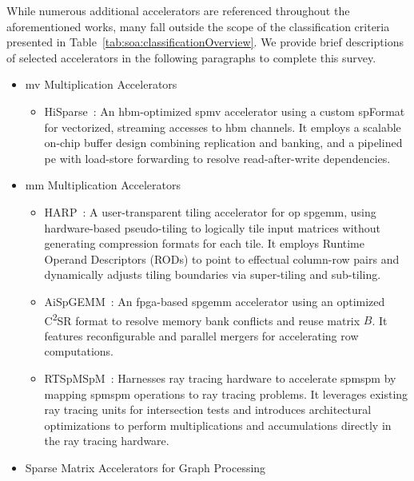 While numerous additional accelerators are referenced throughout the aforementioned works, many fall outside the scope of the classification criteria presented in Table~\ref{tab:soa:classificationOverview}.
We provide brief descriptions of selected accelerators in the following paragraphs to complete this survey.
\begin{itemize}
    \item \acrfull{mv} Multiplication Accelerators
    \begin{itemize}
        \item HiSparse~\cite{Du2022_HiSparse}: An \acrshort{hbm}-optimized \acrshort{spmv} accelerator using a custom \gls{spFormat} for vectorized, streaming accesses to \acrshort{hbm} channels.
        It employs a scalable on-chip buffer design combining replication and banking, and a pipelined \acrshort{pe} with load-store forwarding to resolve read-after-write dependencies.
    \end{itemize}
    \item \acrfull{mm} Multiplication Accelerators
    \begin{itemize}
        \item HARP~\cite{Kim2023_HARP}: A user-transparent \gls{tiling} accelerator for \acrshort{op} \acrshort{spgemm}, using hardware-based pseudo-\gls{tiling} to logically \gls{tile} input matrices without generating compression formats for each \gls{tile}.
        It employs Runtime Operand Descriptors (RODs) to point to effectual column-row pairs and dynamically adjusts \gls{tiling} boundaries via super-\gls{tiling} and sub-\gls{tiling}.
        \item AiSpGEMM~\cite{Tang2025_AiSpGEMM}: An \acrshort{fpga}-based \acrshort{spgemm} accelerator using an optimized C\textsuperscript{2}SR format to resolve memory bank conflicts and reuse matrix $B$.
        It features reconfigurable and parallel mergers for accelerating row computations.
        \item RTSpMSpM~\cite{Zhang2025_RTSpMSpM}: Harnesses ray tracing hardware to accelerate \acrshort{spmspm} by mapping \acrshort{spmspm} operations to ray tracing problems.
        It leverages existing ray tracing units for \gls{intersection} tests and introduces architectural optimizations to perform multiplications and accumulations directly in the ray tracing hardware.
    \end{itemize}
    \item Sparse Matrix Accelerators for Graph Processing
    \begin{itemize}

\end{itemize}
\end{itemize}
